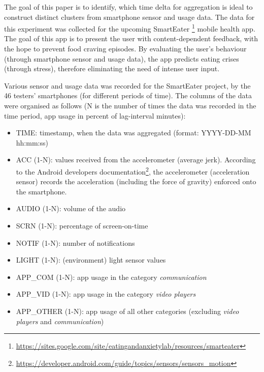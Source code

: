 

The goal of this paper is to identify, which time delta for aggregation is ideal to construct distinct clusters from smartphone sensor and usage data. The data for this experiment was collected for the upcoming SmartEater \footnote{\url{https://sites.google.com/site/eatingandanxietylab/resources/smarteater}} mobile health app. The goal of this app is to present the user with content-dependent feedback, with the hope to prevent food craving episodes. By evaluating the user's behaviour (through smartphone sensor and usage data), the app predicts eating crises (through stress), therefore eliminating the need of intense user input. 



Various sensor and usage data was recorded for the SmartEater project, by the 46 testers' smartphones (for different periods of time). The columns of the data were organised as follows (N is the number of times the data was recorded in the time period, app usage in percent of lag-interval minutes):
 

\begin{itemize}
	\item TIME: timestamp, when the data was aggregated (format: YYYY-DD-MM hh:mm:ss)
	\item ACC (1-N): values received from the accelerometer (average jerk). According to the Android developers documentation\footnote{\url{https://developer.android.com/guide/topics/sensors/sensors_motion}}, the accelerometer (acceleration sensor) records the acceleration (including the force of gravity) enforced onto the smartphone. 
	\item AUDIO (1-N): volume of the audio 
	\item SCRN (1-N): percentage of screen-on-time
	\item NOTIF (1-N): number of notifications
	\item LIGHT (1-N): (environment) light sensor values
	\item APP\_COM (1-N): app usage in the category \textit{communication} 
	\item APP\_VID (1-N): app usage in the category \textit{video players}
	\item APP\_OTHER (1-N): app usage of all other categories (excluding \textit{video players} and \textit{communication})
\end{itemize}


